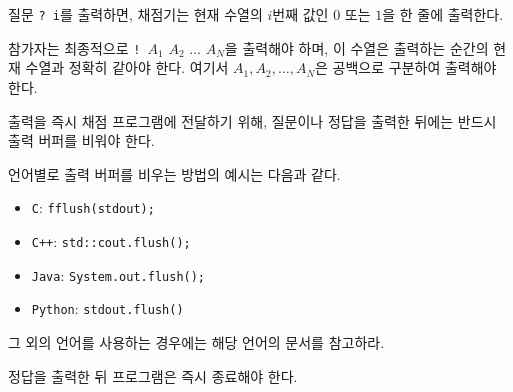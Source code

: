 질문 \texttt{? i}를 출력하면, 채점기는 현재 수열의 $i$번째 값인 $0$ 또는 $1$을 한 줄에 출력한다.

참가자는 최종적으로 \texttt{! }$A_1$ $A_2$ $\dots$ $A_N$을 출력해야 하며, 이 수열은 출력하는 순간의 현재 수열과 정확히 같아야 한다.
여기서 $A_1, A_2, \dots, A_N$은 공백으로 구분하여 출력해야 한다.

출력을 즉시 채점 프로그램에 전달하기 위해, 질문이나 정답을 출력한 뒤에는 반드시 출력 버퍼를 비워야 한다.

언어별로 출력 버퍼를 비우는 방법의 예시는 다음과 같다.

\begin{itemize}
    \item \texttt{C}: \texttt{fflush(stdout);}
    \item \texttt{C++}: \texttt{std::cout.flush();}
    \item \texttt{Java}: \texttt{System.out.flush();}
    \item \texttt{Python}: \texttt{stdout.flush()}
\end{itemize}

그 외의 언어를 사용하는 경우에는 해당 언어의 문서를 참고하라.

정답을 출력한 뒤 프로그램은 즉시 종료해야 한다.